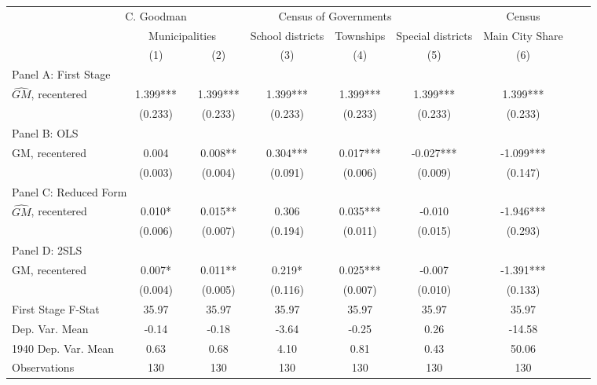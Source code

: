  \begin{tabular}{l*{8}{c}} \toprule
&\multicolumn{1}{c}{C. Goodman}&\multicolumn{4}{c}{Census of Governments}&\multicolumn{1}{c}{Census}\\\cmidrule(lr){2-2}\cmidrule(lr){3-6}\cmidrule(lr){7-7}
&\multicolumn{2}{c}{Municipalities}&\multicolumn{1}{c}{School districts}&\multicolumn{1}{c}{Townships}&\multicolumn{1}{c}{Special districts}&\multicolumn{1}{c}{Main City Share}\\\cmidrule(lr){2-3}\cmidrule(lr){4-6}\cmidrule(lr){7-7}
&\multicolumn{1}{c}{(1)}&\multicolumn{1}{c}{(2)}&\multicolumn{1}{c}{(3)}&\multicolumn{1}{c}{(4)}&\multicolumn{1}{c}{(5)}&\multicolumn{1}{c}{(6)}\\
\cmidrule(lr){1-7}
\multicolumn{6}{l}{Panel A: First Stage}\\
\cmidrule(lr){1-7}
$\widehat{GM}$, recentered&    1.399***&    1.399***&    1.399***&    1.399***&    1.399***&    1.399***\\
                &  (0.233)   &  (0.233)   &  (0.233)   &  (0.233)   &  (0.233)   &  (0.233)   \\
\cmidrule(lr){1-7}
\multicolumn{6}{l}{Panel B: OLS}\\
\cmidrule(lr){1-7}
GM, recentered  &    0.004   &    0.008** &    0.304***&    0.017***&   -0.027***&   -1.099***\\
                &  (0.003)   &  (0.004)   &  (0.091)   &  (0.006)   &  (0.009)   &  (0.147)   \\
\cmidrule(lr){1-7}
\multicolumn{6}{l}{Panel C: Reduced Form}\\
\cmidrule(lr){1-7}
$\widehat{GM}$, recentered&    0.010*  &    0.015** &    0.306   &    0.035***&   -0.010   &   -1.946***\\
                &  (0.006)   &  (0.007)   &  (0.194)   &  (0.011)   &  (0.015)   &  (0.293)   \\
\cmidrule(lr){1-7}
\multicolumn{6}{l}{Panel D: 2SLS}\\
\cmidrule(lr){1-7}
GM, recentered  &    0.007*  &    0.011** &    0.219*  &    0.025***&   -0.007   &   -1.391***\\
                &  (0.004)   &  (0.005)   &  (0.116)   &  (0.007)   &  (0.010)   &  (0.133)   \\
\midrule
First Stage F-Stat&    35.97   &    35.97   &    35.97   &    35.97   &    35.97   &    35.97   \\
Dep. Var. Mean  &    -0.14   &    -0.18   &    -3.64   &    -0.25   &     0.26   &   -14.58   \\
1940 Dep. Var. Mean&     0.63   &     0.68   &     4.10   &     0.81   &     0.43   &    50.06   \\
Observations    &      130   &      130   &      130   &      130   &      130   &      130   \\
       \bottomrule \end{tabular}
